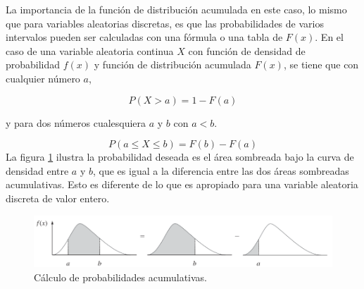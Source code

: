 \documentclass[
  11pt,
]{book}
\theoremstyle{definition}
\theoremstyle{definition}
\theoremstyle{definition}
\theoremstyle{definition}
\theoremstyle{remark}
\begin{document}
La importancia de la función de distribución acumulada en este caso, lo mismo que para variables aleatorias discretas, es que las probabilidades de varios intervalos pueden ser calculadas con una fórmula o una tabla de \(F(x)\). En el caso de una variable aleatoria continua \(X\) con función de densidad de probabilidad \(f(x)\) y función de distribución acumulada \(F(x)\), se tiene que con cualquier número \(a\),

\[
P(X>a) = 1 - F(a)
\]

y para dos números cualesquiera \(a\) y \(b\) con \(a<b\).

\[
P(a\leq X \leq b) = F(b) - F(a)
\]
La figura \ref{fig:densidad3} ilustra la probabilidad deseada es el área sombreada bajo la curva de densidad entre \(a\) y \(b\), que es igual a la diferencia entre las dos áreas sombreadas acumulativas. Esto es diferente de lo que es apropiado para una variable aleatoria discreta de valor entero.

\begin{figure}

{\centering \includegraphics[width=0.8\linewidth]{material/img/densidad3} 

}

\caption{Cálculo de probabilidades acumulativas.}\label{fig:densidad3}
\end{figure}
\end{document}
